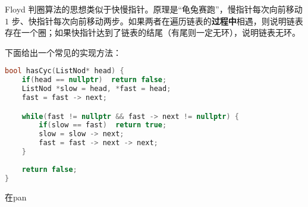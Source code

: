 
Floyd 判圈算法的思想类似于快慢指针。原理是“龟兔赛跑”，慢指针每次向前移动 $1$ 步、快指针每次向前移动两步。如果两者在遍历链表的\textbf{过程中}相遇，则说明链表存在一个圈；如果快指针达到了链表的结尾（有尾则一定无环），说明链表无环。

下面给出一个常见的实现方法：
\begin{lstlisting}[language=cpp]
bool hasCyc(ListNod* head) {
    if(head == nullptr)  return false;
    ListNod *slow = head, *fast = head;
    fast = fast -> next;

    while(fast != nullptr && fast -> next != nullptr) {
        if(slow == fast)  return true;
        slow = slow -> next;
        fast = fast -> next -> next;
    }
    
    return false;
}
\end{lstlisting}

在pan